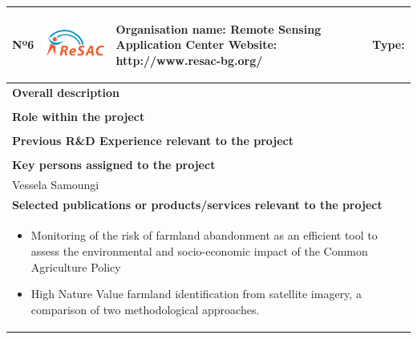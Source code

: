\begin{longtable}[H]{|p{0.7cm}|p{4cm}|p{7cm}|p{1.3cm}|}
	\hline
	\begin{center} Nº6 \end{center} & \begin{center} \includegraphics[scale=1.2]{./logos/logo_resac} \end{center} & \begin{center} \textbf{Organisation name:} Remote Sensing Application Center \newline \textbf{Website:} http://www.resac-bg.org/ \end{center} & \begin{center} Type: \end{center} \\ \hline
	
	\multicolumn{4}{|p{13cm}|}{\textbf{Overall description}}  \\ \hline
	
	\multicolumn{4}{|p{13cm}|}{}  \\ \hline
	
	\multicolumn{4}{|p{13cm}|}{\textbf{Role within the project}}   \\ \hline
	
	\multicolumn{4}{|p{13cm}|}{}  \\ \hline
	
	\multicolumn{4}{|p{13cm}|}{\textbf{Previous R\&D Experience relevant to the project}}  \\ \hline
	
	\multicolumn{4}{|p{13cm}|}{}  \\ \hline
	
	\multicolumn{4}{|p{13cm}|}{\textbf{Key persons assigned to the project}}   \\ \hline
	
	\multicolumn{4}{|p{13cm}|}{Vessela Samoungi}  \\ \hline
	
	\multicolumn{4}{|p{13cm}|}{\textbf{Selected publications or products/services relevant to the project}}  \\ \hline
	
	\multicolumn{4}{|p{13cm}|}{
		\begin{itemize}
			\item  Monitoring of the risk of farmland abandonment as an efficient tool to assess the environmental and socio-economic impact of the Common Agriculture Policy
			\item High Nature Value farmland identification from satellite imagery, a comparison of two methodological approaches.
		\end{itemize}	
      }  \\ \hline
	

\end{longtable}
